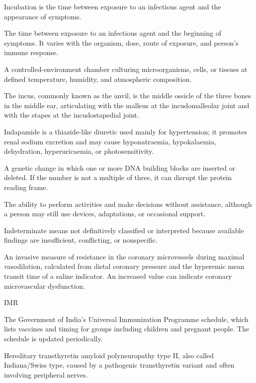  Incubation is the time between exposure to an infectious agent and the appearance of symptoms.

 The time between exposure to an infectious agent and the beginning of symptoms. It varies with the organism, dose, route of exposure, and person’s immune response.

 A controlled-environment chamber culturing microorganisms, cells, or tissues at defined temperature, humidity, and atmospheric composition.

 The incus, commonly known as the anvil, is the middle ossicle of the three bones in the
middle ear, articulating with the malleus at the incudomalleolar joint and with the
stapes at the incudostapedial joint.

 Indapamide is a thiazide-like diuretic used mainly for hypertension; it promotes renal sodium excretion and may cause hyponatraemia, hypokalaemia, dehydration, hyperuricaemia, or photosensitivity.

 A genetic change in which one or more DNA building blocks are inserted or deleted. If the number is not a multiple of three, it can disrupt the protein reading frame.

 The ability to perform activities and make decisions without assistance, although a person may still use devices, adaptations, or occasional support.

 Indeterminate means not definitively classified or interpreted because available findings are insufficient, conflicting, or nonspecific.

 An invasive measure of resistance in the coronary microvessels during maximal vasodilation, calculated from distal coronary pressure and the hyperemic mean transit time of a saline indicator. An increased value can indicate coronary microvascular dysfunction.

\synonyms
IMR

 The Government of India's Universal Immunization Programme schedule, which lists vaccines and timing for groups including children and pregnant people. The schedule is updated periodically.

 Hereditary transthyretin amyloid polyneuropathy type II, also called Indiana/Swiss type, caused by a pathogenic transthyretin variant and often involving peripheral nerves.

